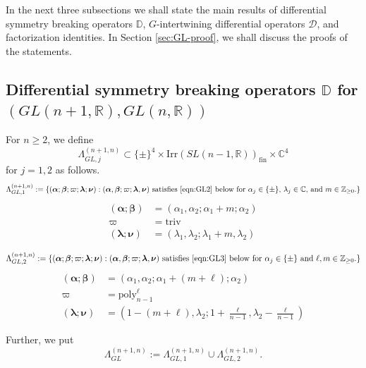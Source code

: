 \documentclass[reqno,11pt]{amsart}
\theoremstyle{remark}
\theoremstyle{definition}
\numberwithin{equation}{section}
\newcommand{\gL}{\Lambda}
\newcommand{\R}{\mathbb{R}}
\newcommand{\C}{\mathbb{C}}
\newcommand{\Z}{\mathbb{Z}}
\newcommand{\Cal}{\mathcal}
\newcommand{\poly}{\mathrm{poly}}
\newcommand{\Irr}{\mathrm{Irr}}
\newcommand{\triv}{\mathrm{triv}}
\newcommand{\fin}{\mathrm{fin}}
\newcommand{\balpha}{\bm{\alpha}}
\newcommand{\bbeta}{\bm{\beta}}
\newcommand{\blambda}{\bm{\lambda}}
\newcommand{\bnu}{\bm{\nu}}
\newcommand{\D}{\Cal{D}}
\newcommand{\bD}{\mathbb{D}}
\begin{document}
In the next three subsections we shall state the main results
of differential symmetry breaking operators
$\bD$, $G$-intertwining differential operators $\D$, and factorization identities.
In Section \ref{sec:GL-proof}, we shall discuss the proofs of the statements.

\subsection{
Differential symmetry breaking operators $\bD$ for $(GL(n+1,\R), GL(n,\R))$
}
\label{sec:GL-DSBO}

For $n\geq 2$, we define 
\begin{equation*}
\gL^{(n+1,n)}_{GL,j} \subset \{\pm\}^4 \times \Irr(SL(n-1,\R))_{\fin} \times \C^4 
\end{equation*}
for $j=1,2$ as follows.
\begin{equation*}
\gL^{(n+1,n)}_{GL,1}:=\{(\balpha;\bbeta; \varpi; \blambda; \bnu):
\text{$(\balpha,\bbeta; \varpi; \blambda, \bnu)$ satisfies \eqref{eqn:GL2}
below for $\alpha_j \in \{\pm\}$, $\lambda_j \in \C$, and $m \in \Z_{\geq 0}$.}\}
\end{equation*}
\begin{align}\label{eqn:GL2}
(\balpha;\bbeta) &= (\alpha_1, \alpha_2; \alpha_1+m; \alpha_2) \nonumber\\
\varpi &=\triv\\
(\blambda;\bnu)&= (\lambda_1, \lambda_2; \lambda_1+m,\lambda_2)\nonumber
\end{align}

\begin{equation*}
\gL^{(n+1,n)}_{GL,2}:=\{(\balpha;\bbeta; \varpi; \blambda; \bnu):
\text{$(\balpha,\bbeta; \varpi; \blambda, \bnu)$ satisfies \eqref{eqn:GL3} below
for $\alpha_j \in \{\pm\}$ and $\ell, m \in \Z_{\geq 0}$.}\}
\end{equation*}
\begin{align}\label{eqn:GL3}
(\balpha;\bbeta) &= (\alpha_1, \alpha_2;\alpha_1+(m+\ell); \alpha_2) \nonumber\\
\varpi &=\poly_{n-1}^\ell\\
(\blambda;\bnu)&= (1-(m+\ell), \lambda_2; 1+\tfrac{\ell}{n-1},\lambda_2-\tfrac{\ell}{n-1})\nonumber
\end{align}

Further, we put
\begin{equation*}
\gL^{(n+1,n)}_{GL}:=\gL^{(n+1,n)}_{GL,1} \cup \gL^{(n+1,n)}_{GL,2}.
\end{equation*}
\end{document}
